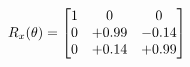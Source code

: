 \documentclass[preview]{standalone}
\begin{document}
\begin{align*}
\special{dvisvgm:raw <g id='unique000'>}R_{x}(\theta) = \begin{bmatrix}1 & 0 & 0 \\0 & +0.99 & -0.14 \\0 & +0.14 & +0.99\end{bmatrix}\special{dvisvgm:raw </g>}
\end{align*}
\end{document}
